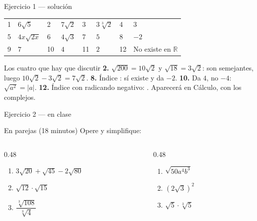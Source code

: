 \documentclass[aspectratio=169,10pt]{beamer}
\begin{document}
\begin{frame}{Ejercicio 1 — solución}
  \scriptsize
  \begin{center}
  \begin{tabular}{@{}llllllll@{}}
    \toprule
    1 & $6\sqrt{5}$ & 2 & $7\sqrt{2}$ & 3 & $3\sqrt[3]{2}$ & 4 & $3$ \\
    5 & $4x\sqrt{2x}$ & 6 & $4\sqrt{3}$ & 7 & $5$ & 8 & $-2$ \\
    9 & $7$ & 10 & $4$ & 11 & $2$ & 12 & No existe en $\mathbb{R}$ \\
    \bottomrule
  \end{tabular}
  \end{center}

  \vspace{0.12cm}
  \begin{alertblock}{Los cuatro que hay que discutir}
    \tiny
    \textbf{2.} $\sqrt{200}=10\sqrt2$ y $\sqrt{18}=3\sqrt2$: son semejantes,
    luego $10\sqrt2-3\sqrt2 = 7\sqrt2$. \quad
    \textbf{8.} Índice : sí existe y da $-2$. \quad
    \textbf{10.} Da $4$, no $-4$: $\sqrt{a^2}=|a|$. \quad
    \textbf{12.} Índice  con radicando negativo:
    . Aparecerá en Cálculo, con los
    complejos.
  \end{alertblock}
\end{frame}

\begin{frame}{Ejercicio 2 — en clase}
  \begin{alertblock}{En parejas (18 minutos)}
    \scriptsize
    Opere y simplifique:

    \vspace{0.25cm}
    \begin{columns}[T,onlytextwidth]
      \begin{column}{0.48\textwidth}
        \begin{enumerate}\setlength{\itemsep}{0.2cm}
          \item $3\sqrt{20} + \sqrt{45} - 2\sqrt{80}$
          \item $\sqrt{12}\cdot\sqrt{15}$
          \item $\dfrac{\sqrt[3]{108}}{\sqrt[3]{4}}$
        \end{enumerate}
      \end{column}
      \begin{column}{0.48\textwidth}
        \begin{enumerate}\setlength{\itemsep}{0.2cm}
          \setcounter{enumi}{3}
          \item $\sqrt{50a^{4}b^{3}}$
          \item $\left(2\sqrt{3}\right)^{2}$
          \item $\sqrt{5}\cdot\sqrt[3]{5}$
        \end{enumerate}
      \end{column}
    \end{columns}
  \end{alertblock}
\end{frame}
\end{document}
